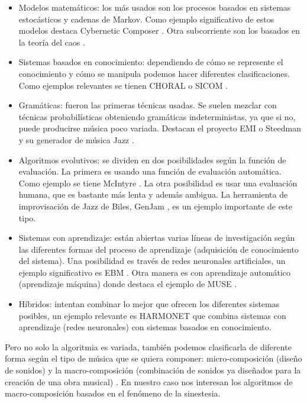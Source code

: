 \begin{itemize}
	\item Modelos matemáticos: los más usados son los procesos basados en sistemas estocásticos y cadenas de Markov. Como ejemplo significativo de estos modelos destaca Cybernetic Composer \cite{AIMusicSurvey}. Otra subcorriente son los basados en la teoría del caos \cite{ChaosTeoriaMusica}.
	\item Sistemas basados en conocimiento: dependiendo de cómo se represente el conocimiento y cómo se manipula podemos hacer diferentes clasificaciones. Como ejemplos relevantes se tienen CHORAL \cite{HistoryAlgorithmicComp} o SICOM \cite{SICOM}.
	\item Gramáticas: fueron las primeras técnicas usadas. Se suelen mezclar con técnicas probabilísticas obteniendo gramáticas indeterministas, ya que si no, puede producirse música poco variada. Destacan el proyecto EMI \cite{HistoryAlgorithmicComp} o Steedman y su generador de música Jazz \cite{AIMethodsForComposition}.
	\item Algoritmos evolutivos: se dividen en dos posibilidades según la función de evaluación. La primera es usando una función de evaluación automática. Como ejemplo se tiene McIntyre \cite{AIMethodsForComposition}. La otra posibilidad es usar una evaluación humana, que es bastante más lenta y además ambigua. La herramienta de improvisación de Jazz de Biles, GenJam \cite{GenJam}, es un ejemplo importante de este tipo.
	\item Sistemas con aprendizaje: están abiertas varias líneas de investigación según las diferentes formas del proceso de aprendizaje (adquisición de conocimiento del sistema). Una posibilidad es través de redes neuronales artificiales, un ejemplo significativo es EBM \cite{AIMethodsForComposition}. Otra manera es con aprendizaje automático (aprendizaje máquina) donde destaca el ejemplo de MUSE \cite{AIMethodsForComposition}.
	\item Híbridos: intentan combinar lo mejor que ofrecen los diferentes sistemas posibles, un ejemplo relevante es HARMONET \cite{AIMethodsForComposition} que combina sistemas con aprendizaje (redes neuronales) con sistemas basados en conocimiento.\\
\end{itemize}


Pero no solo la algoritmia es variada, también podemos clasificarla de diferente forma según el tipo de música que se quiera componer: micro-composición (diseño de sonidos) y la macro-composición (combinación de sonidos ya diseñados para la creación de una obra musical) \cite{AudioVisualSurvey}. En nuestro caso nos interesan los algoritmos de macro-composición basados en el fenómeno de la sinestesia.\\ 


